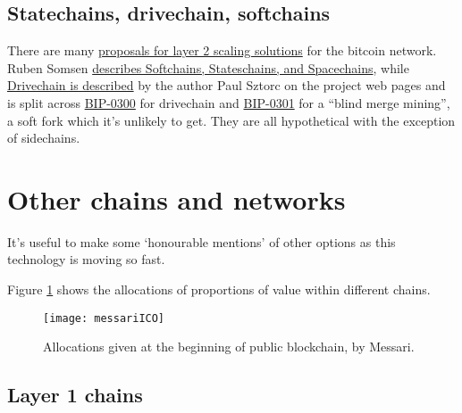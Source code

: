 \subsection{Statechains, drivechain, softchains} 
There are many \href{https://gist.github.com/RubenSomsen/96505e99dc061d6af6b757ff74434e70}{proposals for layer 2 scaling solutions} for the bitcoin network. Ruben Somsen \href{https://gist.github.com/RubenSomsen/c9f0a92493e06b0e29acced61ca9f49a}{describes Softchains, Stateschains, and Spacechains}, while  \href{https://www.drivechain.info/literature/index.html}{Drivechain is described} by the author Paul Sztorc on the project web pages and is split across \href{https://github.com/bitcoin/bips/blob/master/bip-0300.mediawiki}{BIP-0300} for drivechain and \href{https://github.com/bitcoin/bips/blob/master/bip-0301.mediawiki}{BIP-0301} for a ``blind merge mining'', a soft fork which it's unlikely to get. They are all hypothetical with the exception of sidechains.  

\section{Other chains and networks}
It's useful to make some `honourable mentions' of other options as this technology is moving so fast.

Figure \ref{fig:messariICO} shows the allocations of proportions of value within different chains.

\begin{figure}
  \centering
    \texttt{[image: messariICO]}
  \caption{Allocations given at the beginning of public blockchain, by Messari.}
  \label{fig:messariICO}
\end{figure}

\subsection{Layer 1 chains}

